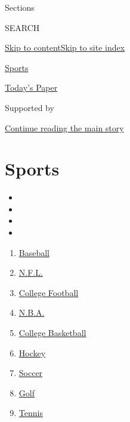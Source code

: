 Sections

SEARCH

\protect\hyperlink{site-content}{Skip to
content}\protect\hyperlink{site-index}{Skip to site index}

\href{https://www.nytimes3xbfgragh.onion/section/sports}{Sports}

\href{https://myaccount.nytimes3xbfgragh.onion/auth/login?response_type=cookie\&client_id=vi}{}

\href{https://www.nytimes3xbfgragh.onion/section/todayspaper}{Today's
Paper}

Supported by

\protect\hyperlink{after-sponsor}{Continue reading the main story}

\hypertarget{sports}{%
\section{Sports}\label{sports}}

\begin{itemize}
\item
\item
\item
\item
\end{itemize}

\begin{enumerate}
\def\labelenumi{\arabic{enumi}.}
\tightlist
\item
  \href{/section/sports/baseball}{Baseball}
\item
  \href{/section/sports/football}{N.F.L.}
\item
  \href{/section/sports/ncaafootball}{College Football}
\item
  \href{/section/sports/basketball}{N.B.A.}
\item
  \href{/section/sports/ncaabasketball}{College Basketball}
\item
  \href{/section/sports/hockey}{Hockey}
\item
  \href{/section/sports/soccer}{Soccer}
\item
  \href{/section/sports/golf}{Golf}
\item
  \href{/section/sports/tennis}{Tennis}
\end{enumerate}

